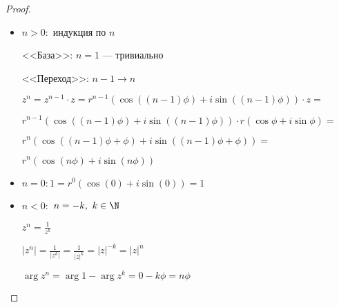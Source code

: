 \begin{proof}

    \begin{itemize}
        \item $n > 0:$ индукция по $n$

        <<База>>: $n = 1$ --- тривиально
        
        <<Переход>>: $n - 1 \to n$
        
        $z^n = z^{n-1} \cdot z = r^{n-1}(\cos((n-1)\phi) + i\sin((n-1)\phi)) \cdot z = $
        
        $r^{n-1}(\cos((n-1)\phi) + i\sin((n-1)\phi)) \cdot r(\cos\phi + i\sin\phi) = $
        
        $r^n(\cos((n-1)\phi + \phi) + i\sin((n-1)\phi + \phi)) = $
        
        $r^n(\cos(n\phi) + i\sin(n\phi))$
    
        \item $n = 0: 1 = r^0(\cos(0) + i\sin(0)) = 1$
    
        \item $n < 0:$ $n = -k,~k \in \N$
    
        $z^n = \frac{1}{z^k}$
        
        $|z^n| = \frac{1}{|z^k|} = \frac{1}{|z|^k} = |z|^{-k} = |z|^n$
        
        $\arg z^n = \arg 1 - \arg z^k = 0 - k \phi = n \phi$
    \end{itemize}    
\end{proof}